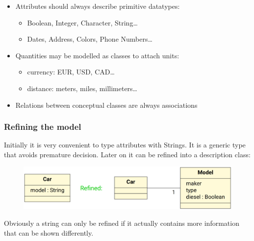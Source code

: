 \documentclass[
../../Software_Engineering_Summary.tex,
]
{subfiles}
\begin{document}
\begin{defbox}
    \begin{itemize}
        \item Attributes should always describe primitive datatypes:
        \begin{itemize}
            \item Boolean, Integer, Character, String\dots
            \item Dates, Address, Colors, Phone Numbers\dots
        \end{itemize}
        \item Quantities may be modelled as classes to attach units:
        \begin{itemize}
            \item currency: EUR, USD, CAD\dots
            \item distance: meters, miles, millimeters\dots
        \end{itemize}
        \item Relations between conceptual classes are always associations
    \end{itemize}
\end{defbox}

\newpage
\subsubsection{Refining the model}
Initially it is very convenient to type attributes with Strings. It is a generic type that avoids premature decision. Later on it can be refined into a description class:
\begin{figure}[htp]
    \centering
    \includegraphics[scale=0.5]{Pics/RefiningModelTypes.png}
\end{figure}

Obviously a string can only be refined if it actually contains more information that can be shown differently. 
\end{document}
